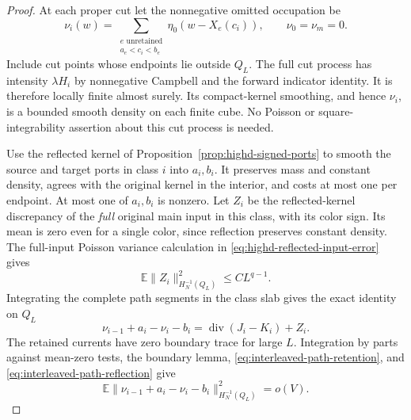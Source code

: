 \documentclass[11pt,reqno]{amsart}
\theoremstyle{definition}
\theoremstyle{remark}
\numberwithin{equation}{section}
\newcommand{\E}{\mathbb E}
\begin{document}
\begin{proof}
At each proper cut let the nonnegative omitted occupation be
\begin{equation}
 \nu_i(w)=\sum_{\substack{e\text{ unretained}\\a_e<c_i<b_e}}
                         \eta_0(w-X_e(c_i)),
 \qquad \nu_0=\nu_m=0.
 \label{eq:interleaved-path-occupation}
\end{equation}
Include cut points whose endpoints lie outside $Q_L$.
The full cut process has intensity $\lambda H_i$ by nonnegative
Campbell and the forward indicator identity. It is therefore locally
finite almost surely. Its compact-kernel smoothing, and hence
$\nu_i$, is a bounded smooth density on each finite cube. No Poisson
or square-integrability assertion about this cut process is needed.

Use the reflected kernel of
Proposition~\ref{prop:highd-signed-ports} to smooth the source and
target ports in class $i$ into $a_i,b_i$. It preserves mass and constant
density, agrees with the original kernel in the interior, and costs
at most one per endpoint. At most one of $a_i,b_i$ is nonzero.
Let $Z_i$ be the reflected-kernel discrepancy of the \emph{full}
original main input in this class, with its color sign. Its mean is
zero even for a single color, since reflection preserves constant
density. The full-input Poisson variance calculation in
\eqref{eq:highd-reflected-input-error} gives
\begin{equation}
             \E\|Z_i\|_{H_N^{-1}(Q_L)}^2\le CL^{q-1}.
 \label{eq:interleaved-path-reflection}
\end{equation}
Integrating the complete path segments in the class slab gives the
exact identity on $Q_L$
\begin{equation}
 \nu_{i-1}+a_i-\nu_i-b_i
           =\operatorname{div}(J_i-K_i)+Z_i.
 \label{eq:interleaved-path-stage-divergence}
\end{equation}
The retained currents have zero boundary trace for large $L$.
Integration by parts against mean-zero tests, the boundary lemma,
\eqref{eq:interleaved-path-retention}, and
\eqref{eq:interleaved-path-reflection} give
\begin{equation}
 \E\|\nu_{i-1}+a_i-\nu_i-b_i\|_{H_N^{-1}(Q_L)}^2=o(V).
 \label{eq:interleaved-path-stage-neumann}
\end{equation}


\end{proof}
\end{document}
